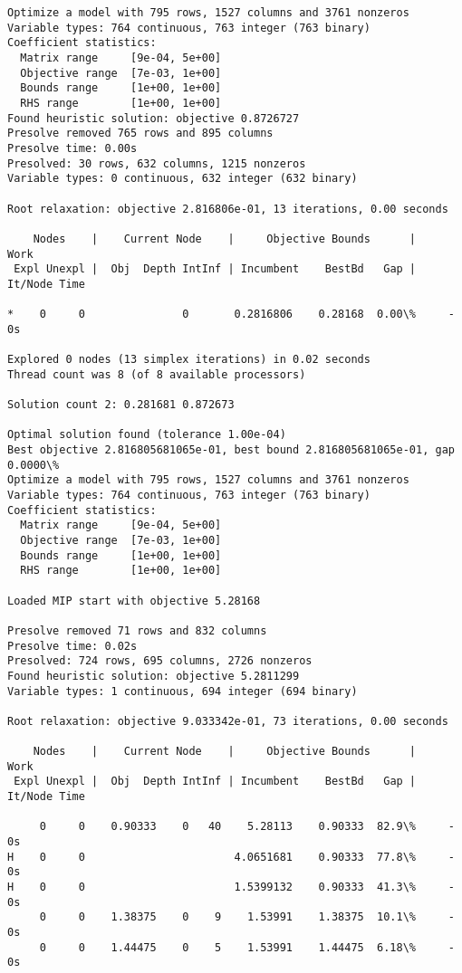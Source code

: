 \documentclass[11pt]{article}
\begin{document}
    \begin{Verbatim}[commandchars=\\\{\}]
Optimize a model with 795 rows, 1527 columns and 3761 nonzeros
Variable types: 764 continuous, 763 integer (763 binary)
Coefficient statistics:
  Matrix range     [9e-04, 5e+00]
  Objective range  [7e-03, 1e+00]
  Bounds range     [1e+00, 1e+00]
  RHS range        [1e+00, 1e+00]
Found heuristic solution: objective 0.8726727
Presolve removed 765 rows and 895 columns
Presolve time: 0.00s
Presolved: 30 rows, 632 columns, 1215 nonzeros
Variable types: 0 continuous, 632 integer (632 binary)

Root relaxation: objective 2.816806e-01, 13 iterations, 0.00 seconds

    Nodes    |    Current Node    |     Objective Bounds      |     Work
 Expl Unexpl |  Obj  Depth IntInf | Incumbent    BestBd   Gap | It/Node Time

*    0     0               0       0.2816806    0.28168  0.00\%     -    0s

Explored 0 nodes (13 simplex iterations) in 0.02 seconds
Thread count was 8 (of 8 available processors)

Solution count 2: 0.281681 0.872673 

Optimal solution found (tolerance 1.00e-04)
Best objective 2.816805681065e-01, best bound 2.816805681065e-01, gap 0.0000\%
Optimize a model with 795 rows, 1527 columns and 3761 nonzeros
Variable types: 764 continuous, 763 integer (763 binary)
Coefficient statistics:
  Matrix range     [9e-04, 5e+00]
  Objective range  [7e-03, 1e+00]
  Bounds range     [1e+00, 1e+00]
  RHS range        [1e+00, 1e+00]

Loaded MIP start with objective 5.28168

Presolve removed 71 rows and 832 columns
Presolve time: 0.02s
Presolved: 724 rows, 695 columns, 2726 nonzeros
Found heuristic solution: objective 5.2811299
Variable types: 1 continuous, 694 integer (694 binary)

Root relaxation: objective 9.033342e-01, 73 iterations, 0.00 seconds

    Nodes    |    Current Node    |     Objective Bounds      |     Work
 Expl Unexpl |  Obj  Depth IntInf | Incumbent    BestBd   Gap | It/Node Time

     0     0    0.90333    0   40    5.28113    0.90333  82.9\%     -    0s
H    0     0                       4.0651681    0.90333  77.8\%     -    0s
H    0     0                       1.5399132    0.90333  41.3\%     -    0s
     0     0    1.38375    0    9    1.53991    1.38375  10.1\%     -    0s
     0     0    1.44475    0    5    1.53991    1.44475  6.18\%     -    0s


\end{Verbatim}
\end{document}
